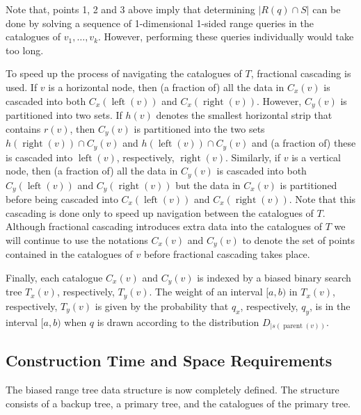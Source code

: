 \documentclass[lotsofwhite,charterfonts]{patmorin}
\DeclareMathOperator{\lft}{left}
\DeclareMathOperator{\rght}{right}
\DeclareMathOperator{\prnt}{parent}
\begin{document}
Note that, points 1, 2 and 3 above imply that determining $|R(q)\cap S|$
can be done by solving a sequence of 1-dimensional 1-sided range
queries in the catalogues of $v_1,\ldots,v_k$.  However, performing
these queries individually would take too long.


%

To speed up the process of navigating the catalogues of $T$,
fractional cascading \cite{ae76} is used.  If $v$ is a horizontal
node, then (a fraction of) all the data in $C_x(v)$ is cascaded into
both $C_x(\lft(v))$ and $C_x(\rght(v))$.  However, $C_y(v)$ is
partitioned into two sets.  If $h(v)$ denotes the smallest horizontal
strip that contains $r(v)$, then $C_y(v)$ is partitioned into the two
sets $h(\rght(v))\cap C_y(v)$ and $h(\lft(v))\cap C_y(v)$ and (a
fraction of) these is cascaded into $\lft(v)$, respectively,
$\rght(v)$.  Similarly, if $v$ is a vertical node, then (a fraction
of) all the data in $C_y(v)$ is cascaded into both $C_y(\lft(v))$ and
$C_y(\rght(v))$ but the data in $C_x(v)$ is partitioned before being
cascaded into $C_x(\lft(v))$ and $C_x(\rght(v))$.  Note that this
cascading is done only to speed up navigation between the catalogues
of $T$.  Although fractional cascading introduces extra data into the
catalogues of $T$ we will continue to use the notations $C_x(v)$ and
$C_y(v)$ to denote the set of points contained in the catalogues of
$v$ before fractional cascading takes place.

Finally, each catalogue $C_x(v)$ and $C_y(v)$ is indexed by a biased
binary search tree $T_x(v)$, respectively, $T_y(v)$.  The weight of an
interval $[a,b)$ in $T_x(v)$, respectively, $T_y(v)$ is given by the
probability that $q_x$, respectively, $q_y$, is in the interval
$[a,b)$ when $q$ is drawn according to the distribution $D_{\mid
s(\prnt(v))}$.

\subsection{Construction Time and Space Requirements}

The biased range tree data structure is now completely defined.  The
structure consists of a backup tree, a primary tree, and the
catalogues of the primary tree.
\end{document}
